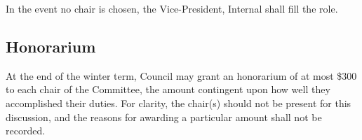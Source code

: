In the event no chair is chosen, the Vice-President, Internal shall fill the role.

\subsection{Honorarium}
At the end of the winter term, Council may grant an honorarium of at most \$300 to each chair of the Committee, the amount contingent upon how well they accomplished their duties. For clarity, the chair(s) should not be present for this discussion, and the reasons for awarding a particular amount shall not be recorded.